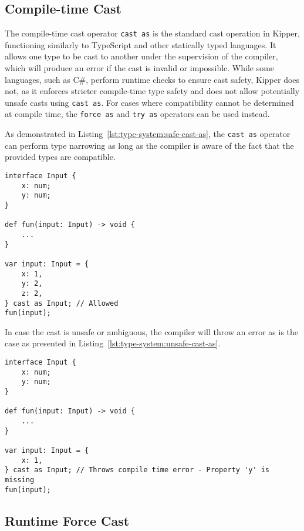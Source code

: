 \subsection{Compile-time Cast}
\label{sec:compile-time-cast}

The compile-time cast operator \lstinline|cast as| is the standard cast operation in Kipper, functioning similarly to TypeScript and other statically typed languages. It allows one type to be cast to another under the supervision of the compiler, which will produce an error if the cast is invalid or impossible. While some languages, such as C\#, perform runtime checks to ensure cast safety, Kipper does not, as it enforces stricter compile-time type safety and does not allow potentially unsafe casts using \lstinline|cast as|. For cases where compatibility cannot be determined at compile time, the \lstinline|force as| and \lstinline|try as| operators can be used instead.

As demonstrated in Listing~\ref{lst:type-system:safe-cast-as}, the \lstinline|cast as| operator can perform type narrowing as long as the compiler is aware of the fact that the provided types are compatible.

\begin{lstlisting}[language=Kipper,caption=Correctly casting an object to an interface using the \lstinline|cast as| operator,label=lst:type-system:safe-cast-as]
interface Input {
	x: num;
	y: num;
}

def fun(input: Input) -> void {
	...
}

var input: Input = {
	x: 1,
	y: 2,
	z: 2,
} cast as Input; // Allowed
fun(input);
\end{lstlisting}

In case the cast is unsafe or ambiguous, the compiler will throw an error as is the case as presented in Listing~\ref{lst:type-system:unsafe-cast-as}.

\begin{lstlisting}[language=Kipper,caption=Incorrectly casting an object to an interface using the \lstinline|cast as| operator,label=lst:type-system:unsafe-cast-as]
interface Input {
	x: num;
	y: num;
}

def fun(input: Input) -> void {
	...
}

var input: Input = {
	x: 1,
} cast as Input; // Throws compile time error - Property 'y' is missing
fun(input);
\end{lstlisting}

\subsection{Runtime Force Cast}
\label{sec:runtime-force-cast}

